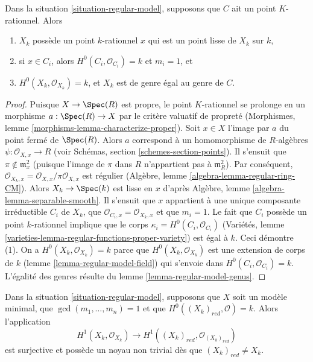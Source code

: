 \begin{lemma}
\label{lemma-numerical-type-rational-point}
Dans la situation \ref{situation-regular-model}, supposons que $C$ ait un point $K$-rationnel.
Alors
\begin{enumerate}
\item $X_k$ possède un point $k$-rationnel $x$ qui est un point lisse de $X_k$
sur $k$,
\item si $x \in C_i$, alors $H^0(C_i, \mathcal{O}_{C_i}) = k$ et
$m_i = 1$, et
\item $H^0(X_k, \mathcal{O}_{X_k}) = k$, et $X_k$ est de genre égal au
genre de $C$.
\end{enumerate}
\end{lemma}

\begin{proof}
Puisque $X \to \Spec(R)$ est propre, le point $K$-rationnel se prolonge en
un morphisme $a : \Spec(R) \to X$ par le critère valuatif de propreté
(Morphismes, lemme \ref{morphisms-lemma-characterize-proper}).
Soit $x \in X$ l'image par $a$ du point fermé de $\Spec(R)$.
Alors $a$ correspond à un homomorphisme de $R$-algèbres
$\psi : \mathcal{O}_{X, x} \to R$
(voir Schémas, section \ref{schemes-section-points}).
Il s'ensuit que $\pi \not \in \mathfrak m_x^2$ (puisque l'image
de $\pi$ dans $R$ n'appartient pas à $\mathfrak m_R^2$).
Par conséquent, $\mathcal{O}_{X_k, x} = \mathcal{O}_{X, x}/\pi \mathcal{O}_{X, x}$
est régulier (Algèbre, lemme \ref{algebra-lemma-regular-ring-CM}).
Alors $X_k \to \Spec(k)$ est lisse en $x$ d'après
Algèbre, lemme \ref{algebra-lemma-separable-smooth}.
Il s'ensuit que $x$ appartient à une unique composante irréductible
$C_i$ de $X_k$, que $\mathcal{O}_{C_i, x} = \mathcal{O}_{X_k, x}$
et que $m_i = 1$. Le fait que $C_i$ possède un
point $k$-rationnel implique que le corps
$\kappa_i = H^0(C_i, \mathcal{O}_{C_i})$
(Variétés, lemme \ref{varieties-lemma-regular-functions-proper-variety})
est égal à $k$. Ceci démontre (1). On a
$H^0(X_k, \mathcal{O}_{X_k}) = k$
parce que $H^0(X_k, \mathcal{O}_{X_k})$ est une extension de corps
de $k$ (lemme \ref{lemma-regular-model-field})
qui s'envoie dans $H^0(C_i, \mathcal{O}_{C_i}) = k$.
L'égalité des genres résulte du lemme \ref{lemma-regular-model-genus}.
\end{proof}

\begin{lemma}
\label{lemma-genus-reduction-smaller}
Dans la situation \ref{situation-regular-model}, supposons que $X$ soit un modèle minimal,
que $\gcd(m_1, \ldots, m_n) = 1$ et que $H^0((X_k)_{red}, \mathcal{O}) = k$. Alors
l'application
$$
H^1(X_k, \mathcal{O}_{X_k}) \to H^1((X_k)_{red}, \mathcal{O}_{(X_k)_{red}})
$$
est surjective et possède un noyau non trivial dès que $(X_k)_{red} \not = X_k$.
\end{lemma}

